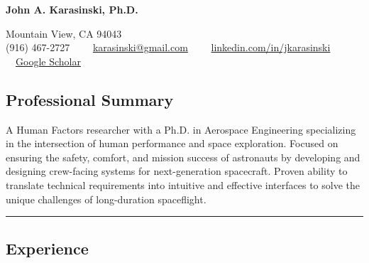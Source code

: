 \documentclass[10pt,letterpaper]{article}
\newenvironment{indentsection}[1]%
{\begin{list}{}%
	{\setlength{\leftmargin}{#1}}%
	\item[]%
}
{\end{list}}
\begin{document}
\begin{center}
	{\LARGE \textbf{John A. Karasinski, Ph.D.}}

	Mountain View, CA 94043
	\\
	(916) 467-2727\ \ \textbullet
	\ \ \href{mailto:karasinski@gmail.com}{karasinski@gmail.com}\ \ \textbullet
	\ \ \href{https://www.linkedin.com/in/jkarasinski/}{linkedin.com/in/jkarasinski}\ \ \textbullet
	\ \ \href{https://scholar.google.com/citations?user=06yynpAAAAAJ&hl=en}{Google Scholar}
\end{center}

\vspace{-0.5em}
\subsection*{Professional Summary}
\begin{indentsection}{\parindent}
A Human Factors researcher with a Ph.D. in Aerospace Engineering specializing in the intersection of human performance and space exploration. Focused on ensuring the safety, comfort, and mission success of astronauts by developing and designing crew-facing systems for next-generation spacecraft. Proven ability to translate technical requirements into intuitive and effective interfaces to solve the unique challenges of long-duration spaceflight.
\end{indentsection}

\hrule
\vspace{-0.5em}
\subsection*{Experience}
\end{document}
